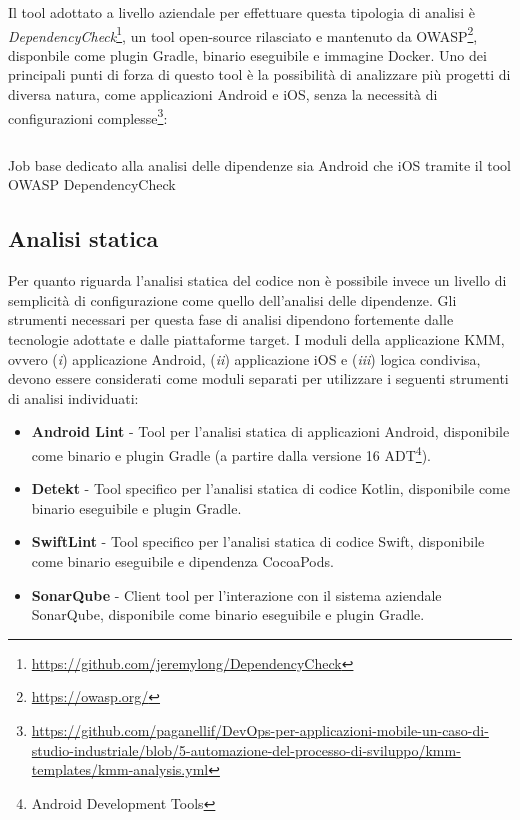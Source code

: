 Il tool adottato a livello aziendale per effettuare questa tipologia di analisi è \textit{DependencyCheck}\footnote{\href{https://github.com/jeremylong/DependencyCheck}{https://github.com/jeremylong/DependencyCheck}}, un tool open-source rilasciato e mantenuto da OWASP\footnote{\href{https://owasp.org/}{https://owasp.org/}}, disponbile come plugin Gradle, binario eseguibile e immagine Docker. Uno dei principali punti di forza di questo tool è la possibilità di analizzare più progetti di diversa natura, come applicazioni Android e iOS, senza la necessità di configurazioni complesse\footnote{\href{https://github.com/paganellif/DevOps-per-applicazioni-mobile-un-caso-di-studio-industriale/blob/5-automazione-del-processo-di-sviluppo/kmm-templates/kmm-analysis.yml}{https://github.com/paganellif/DevOps-per-applicazioni-mobile-un-caso-di-studio-industriale/blob/5-automazione-del-processo-di-sviluppo/kmm-templates/kmm-analysis.yml}}:

\begin{listing}[H]
    \inputminted{yaml}{code/depcheck-job.yaml}
    \caption{Job base dedicato alla analisi delle dipendenze sia Android che iOS tramite il tool OWASP DependencyCheck}
\end{listing}

\subsection{Analisi statica}
Per quanto riguarda l'analisi statica del codice non è possibile invece un livello di semplicità di configurazione come quello dell'analisi delle dipendenze. Gli strumenti necessari per questa fase di analisi dipendono fortemente dalle tecnologie adottate e dalle piattaforme target. I moduli della applicazione KMM, ovvero (\textit{i}) applicazione Android, (\textit{ii}) applicazione iOS e (\textit{iii}) logica condivisa, devono essere considerati come moduli separati per utilizzare i seguenti strumenti di analisi individuati:

\begin{itemize}
    \item \textbf{Android Lint}  - Tool per l'analisi statica di applicazioni Android, disponibile come binario e plugin Gradle (a partire dalla versione 16 ADT\footnote{Android Development Tools}).
    \item \textbf{Detekt}  - Tool specifico per l'analisi statica di codice Kotlin, disponibile come binario eseguibile e plugin Gradle.
    \item \textbf{SwiftLint} - Tool specifico per l'analisi statica di codice Swift, disponibile come binario eseguibile e dipendenza CocoaPods.
    \item \textbf{SonarQube} - Client tool per l'interazione con il sistema aziendale SonarQube, disponibile come binario eseguibile e plugin Gradle.
\end{itemize}

